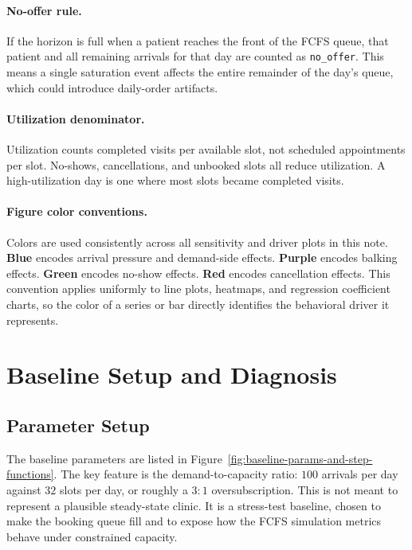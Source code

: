 \documentclass[11pt]{article}
\begin{document}
\paragraph{No-offer rule.}
If the horizon is full when a patient reaches the front of the FCFS queue,
that patient and all remaining arrivals for that day are counted as
\texttt{no\_offer}. This means a single saturation event affects the entire
remainder of the day's queue, which could introduce daily-order artifacts.

\paragraph{Utilization denominator.}
Utilization counts completed visits per available slot, not scheduled
appointments per slot. No-shows, cancellations, and unbooked slots all reduce
utilization. A high-utilization day is one where most slots became completed
visits.

\paragraph{Figure color conventions.}
Colors are used consistently across all sensitivity and driver plots in this
note. \textbf{Blue} encodes arrival pressure and demand-side effects.
\textbf{Purple} encodes balking effects. \textbf{Green} encodes no-show
effects. \textbf{Red} encodes cancellation effects. This convention applies
uniformly to line plots, heatmaps, and regression coefficient charts, so
the color of a series or bar directly identifies the behavioral driver it
represents.

\section{Baseline Setup and Diagnosis}
\label{sec:baseline}

\subsection{Parameter Setup}

The baseline parameters are listed in Figure~\ref{fig:baseline-params-and-step-functions}. The key feature is the demand-to-capacity ratio: \(100\) arrivals per day against \(32\) slots per day, or roughly a \(3{:}1\) oversubscription. This is not meant to represent a plausible steady-state clinic. It is a stress-test baseline, chosen to make the booking queue fill and to expose how the FCFS simulation metrics behave under constrained capacity.
\end{document}
